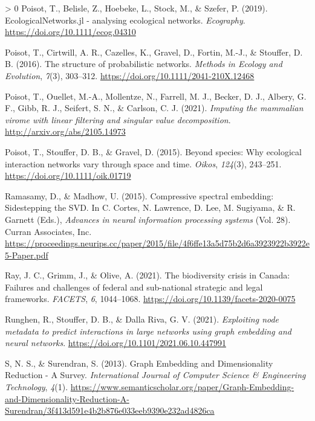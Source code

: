 \documentclass[10pt,oneside]{article}
\newlength{\cslhangindent}
\newenvironment{CSLReferences}[3] %
 {%
  \setlength{\parindent}{0pt}
  \ifodd #1 \everypar{\setlength{\hangindent}{\cslhangindent}}\ignorespaces\fi
  \ifnum #2 > 0
  \setlength{\parskip}{#2\baselineskip}
  \fi
 }%
 {}
\begin{document}
\begin{CSLReferences}{1}{0}
\leavevmode\hypertarget{ref-Poisot2019EcoJl}{}%
Poisot, T., Belisle, Z., Hoebeke, L., Stock, M., \& Szefer, P. (2019).
EcologicalNetworks.jl - analysing ecological networks. \emph{Ecography}.
\url{https://doi.org/10.1111/ecog.04310}

\leavevmode\hypertarget{ref-Poisot2016StrPro}{}%
Poisot, T., Cirtwill, A. R., Cazelles, K., Gravel, D., Fortin, M.-J., \&
Stouffer, D. B. (2016). The structure of probabilistic networks.
\emph{Methods in Ecology and Evolution}, \emph{7}(3), 303--312.
\url{https://doi.org/10.1111/2041-210X.12468}

\leavevmode\hypertarget{ref-Poisot2021ImpMam}{}%
Poisot, T., Ouellet, M.-A., Mollentze, N., Farrell, M. J., Becker, D.
J., Albery, G. F., Gibb, R. J., Seifert, S. N., \& Carlson, C. J.
(2021). \emph{Imputing the mammalian virome with linear filtering and
singular value decomposition}. \url{http://arxiv.org/abs/2105.14973}

\leavevmode\hypertarget{ref-Poisot2015SpeWhy}{}%
Poisot, T., Stouffer, D. B., \& Gravel, D. (2015). Beyond species: Why
ecological interaction networks vary through space and time.
\emph{Oikos}, \emph{124}(3), 243--251.
\url{https://doi.org/10.1111/oik.01719}

\leavevmode\hypertarget{ref-Ramasamy2015ComSpe}{}%
Ramasamy, D., \& Madhow, U. (2015). Compressive spectral embedding:
Sidestepping the SVD. In C. Cortes, N. Lawrence, D. Lee, M. Sugiyama, \&
R. Garnett (Eds.), \emph{Advances in neural information processing
systems} (Vol. 28). Curran Associates, Inc.
\url{https://proceedings.neurips.cc/paper/2015/file/4f6ffe13a5d75b2d6a3923922b3922e5-Paper.pdf}

\leavevmode\hypertarget{ref-Ray2021BioCri}{}%
Ray, J. C., Grimm, J., \& Olive, A. (2021). The biodiversity crisis in
Canada: Failures and challenges of federal and sub-national strategic
and legal frameworks. \emph{FACETS}, \emph{6}, 1044--1068.
\url{https://doi.org/10.1139/facets-2020-0075}

\leavevmode\hypertarget{ref-Runghen2021ExpNod}{}%
Runghen, R., Stouffer, D. B., \& Dalla Riva, G. V. (2021).
\emph{Exploiting node metadata to predict interactions in large networks
using graph embedding and neural networks}.
\url{https://doi.org/10.1101/2021.06.10.447991}

\leavevmode\hypertarget{ref-S2013GraEmb}{}%
S, N. S., \& Surendran, S. (2013). Graph Embedding and Dimensionality
Reduction - A Survey. \emph{International Journal of Computer Science \&
Engineering Technology}, \emph{4}(1).
\url{https://www.semanticscholar.org/paper/Graph-Embedding-and-Dimensionality-Reduction-A-Surendran/3f413d591e4b2b876e033eeb9390e232ad4826ca}


\end{CSLReferences}
\end{document}
